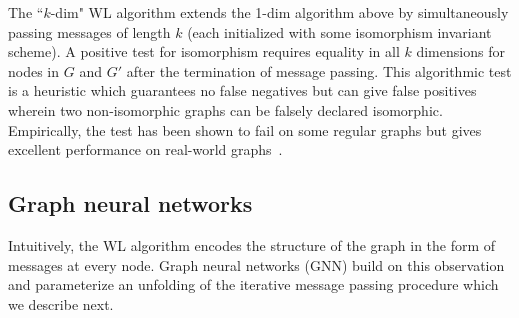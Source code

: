 \documentclass{article}
\begin{document}
The ``$k$-dim" WL algorithm extends the 1-dim algorithm above by simultaneously passing messages of length $k$ (each initialized with some isomorphism invariant scheme).
A positive test for isomorphism requires equality in all $k$ dimensions for nodes in $G$ and $G'$ after the termination of message passing. 
This algorithmic test is a heuristic which guarantees no false negatives but can give false positives wherein two non-isomorphic graphs can be falsely declared isomorphic. 
Empirically, the test has been shown to fail on some regular graphs but gives excellent performance on real-world graphs~\citep{shervashidze2011weisfeiler}.

\subsection{Graph neural networks}
Intuitively, the WL algorithm encodes the structure of the graph in the form of messages at every node.
Graph neural networks (GNN) build on this observation and parameterize an unfolding of the iterative message passing procedure which we describe next.
\end{document}
